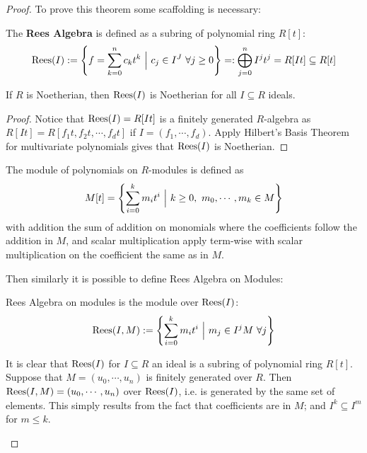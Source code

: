 \documentclass{article}
\begin{document}
\begin{proof}
    To prove this theorem some scaffolding is necessary:

    \begin{definition}
        The \textbf{Rees Algebra} is defined as a subring of polynomial ring $R[t]$:
        \[
            \mathrm{Rees}(I) := \left\{ f = \sum\limits_{k=0}^n c_k t^k \ \Big|\  c_j\in I^J\ \forall j \geq 0 \right\} =: \bigoplus\limits_{j=0}^n I^j t^j  = R[It] \subseteq R[t]
        \]
    \end{definition}

    \begin{proposition}\label{prop:Rees on Noeth is Noeth}
        If $R$ is Noetherian, then $\mathrm{Rees}(I)$ is Noetherian for all $I\subseteq R$ ideals. 
    \end{proposition}

    \begin{proof}
        Notice that $\mathrm{Rees}(I) = R[It]$ is a finitely generated $R$-algebra as $R[It] = R[f_1t, f_2t, \cdots, f_dt]$ if $I = (f_1, \cdots, f_d)$. Apply Hilbert's Basis Theorem for multivariate polynomials gives that $\mathrm{Rees}(I)$ is Noetherian.
    \end{proof}

    \begin{definition}
        The module of polynomials on $R$-modules is defined as
        \[
            M[t] = \left\{ \sum\limits_{i=0}^k m_i t^i \ \Big|\  k \geq 0,\ m_0, \cdots, m_k \in M \right\}
        \]
        with addition the sum of addition on monomials where the coefficients follow the addition in $M$, and scalar multiplication apply term-wise with scalar multiplication on the coefficient the same as in $M$. 
    \end{definition}

    Then similarly it is possible to define Rees Algebra on Modules:
    \begin{definition}
        Rees Algebra on modules is the module over $\mathrm{Rees}(I)$:
        \[
            \mathrm{Rees}(I, M) := \left\{ \sum\limits_{i=0}^k m_i t^i \ \Big|\  m_j\in I^j M \ \forall j \right\}
        \]
    \end{definition}

    \begin{remark}\label{rmk:Rees(I,M) Noeth if M Noeth}
        It is clear that $\mathrm{Rees}(I)$ for $I \subseteq R$ an ideal is a subring of polynomial ring $R[t]$. Suppose that $M = (u_0, \cdots, u_n)$ is finitely generated over $R$. Then $\mathrm{Rees}(I, M) = (u_0, \cdots, u_n)$ over $\mathrm{Rees}(I)$, i.e. is generated by the same set of elements. This simply results from the fact that coefficients are in $M$; and $I^{k}\subseteq I^m$ for $m\leq k$.


\end{remark}
\end{proof}
\end{document}

